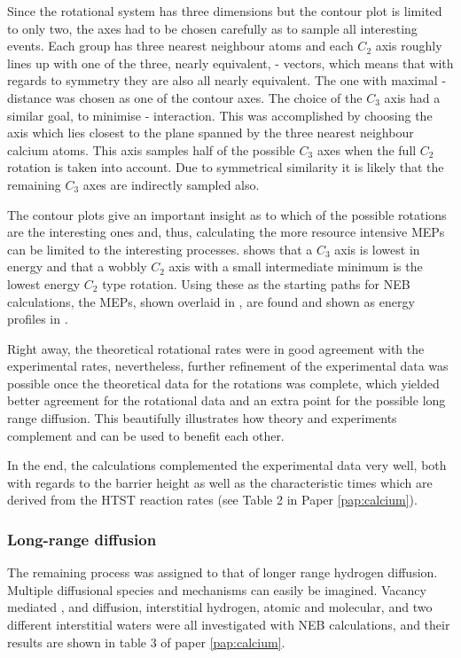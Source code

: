 Since the rotational system has three dimensions but the contour plot is limited to only two, the axes had to be chosen carefully as to sample all interesting events.
Each  group has three nearest neighbour  atoms and each $C_2$ axis roughly lines up with one of the three, nearly equivalent, - vectors, which means that with regards to symmetry they are also all nearly equivalent.
The one with maximal - distance was chosen as one of the contour axes.
The choice of the $C_3$ axis had a similar goal, to minimise - interaction.
This was accomplished by choosing the axis which lies closest to the plane spanned by the three nearest neighbour calcium atoms.
This axis samples half of the possible $C_3$ axes when the full $C_2$ rotation is taken into account.
Due to symmetrical similarity it is likely that the remaining $C_3$ axes are indirectly sampled also.

The contour plots give an important insight as to which of the possible rotations are the interesting ones and, thus, calculating the more resource intensive MEPs can be limited to the interesting processes.
 shows that a $C_3$ axis is lowest in energy and that a wobbly $C_2$ axis with a small intermediate minimum is the lowest energy $C_2$ type rotation.
Using these as the starting paths for NEB calculations, the MEPs, shown overlaid in , are found and shown as energy profiles in .

Right away, the theoretical rotational rates were in good agreement with the experimental rates, nevertheless, further refinement of the experimental data was possible once the theoretical data for the rotations was complete, which yielded better agreement for the rotational data and an extra point for the possible long range diffusion.
This beautifully illustrates how theory and experiments complement and can be used to benefit each other.

In the end, the calculations complemented the experimental data very well, both with regards to the barrier height as well as the characteristic times which are derived from the HTST reaction rates (see Table 2 in Paper \ref{pap:calcium}).

\subsubsection{Long-range diffusion}
The remaining process was assigned to that of longer range hydrogen diffusion.
Multiple diffusional species and mechanisms can easily be imagined.
Vacancy mediated ,   and  diffusion, interstitial hydrogen, atomic and molecular, and two different interstitial waters were all investigated with NEB calculations, and their results are shown in table 3 of paper \ref{pap:calcium}.

